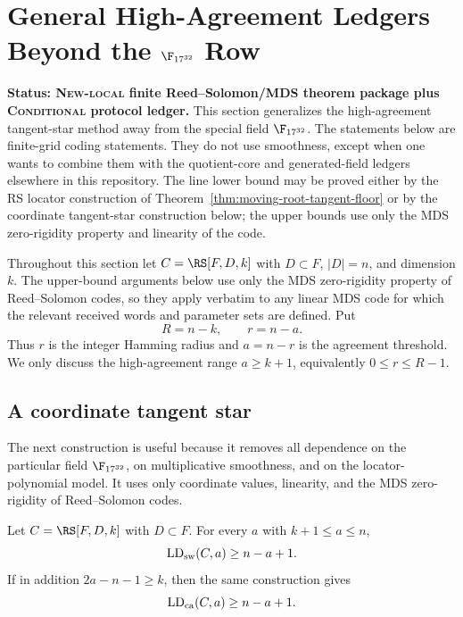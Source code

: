 \section{General High-Agreement Ledgers Beyond the \texorpdfstring{$\F_{17^{32}}$}{F17^32} Row}
\label{sec:general-high-agreement-ledgers}

\textbf{Status: \textsc{New-local} finite Reed--Solomon/MDS theorem package plus
\textsc{Conditional} protocol ledger.}
This section generalizes the high-agreement tangent-star method away from the
special field \(\F_{17^{32}}\).  The statements below are finite-grid coding
statements.  They do not use smoothness, except when one wants to combine them
with the quotient-core and generated-field ledgers elsewhere in this repository.
The line lower bound may be proved either by the RS locator construction of
Theorem~\ref{thm:moving-root-tangent-floor} or by the coordinate tangent-star
construction below; the upper bounds use only the MDS zero-rigidity property and
linearity of the code.

Throughout this section let \(C=\RS[F,D,k]\) with \(D\subset F\), \(|D|=n\),
and dimension \(k\).  The upper-bound arguments below use only the MDS
zero-rigidity property of Reed--Solomon codes, so they apply verbatim to any
linear MDS code for which the relevant received words and parameter sets are
defined.  Put
\[
  R=n-k,
  \qquad r=n-a .
\]
Thus \(r\) is the integer Hamming radius and \(a=n-r\) is the agreement
threshold.  We only discuss the high-agreement range \(a\ge k+1\), equivalently
\(0\le r\le R-1\).

\subsection{A coordinate tangent star}

The next construction is useful because it removes all dependence on the
particular field \(\F_{17^{32}}\), on multiplicative smoothness, and on the
locator-polynomial model.  It uses only coordinate values, linearity, and the
MDS zero-rigidity of Reed--Solomon codes.

\begin{lemma}
\label{lem:coordinate-tangent-star}
Let \(C=\RS[F,D,k]\) with \(D\subset F\).  For every \(a\) with \(k+1\le a\le n\),
\[
  \operatorname{LD}_{\rm sw}(C,a)\ge n-a+1 .
\]
If in addition \(2a-n-1\ge k\), then the same construction gives
\[
  \operatorname{LD}_{\rm ca}(C,a)\ge n-a+1 .
\]
\end{lemma}

